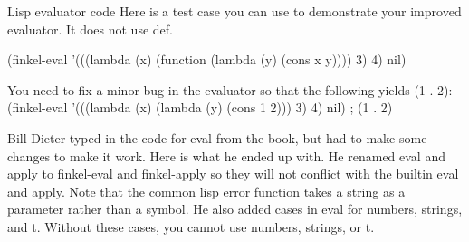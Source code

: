 Lisp evaluator code Here is a test case you can use to demonstrate your
improved evaluator. It does not use def.

\begin{english}
(finkel-eval '(((lambda (x) (function (lambda (y) (cons x y)))) 3) 4) nil)
\end{english}

You need to fix a minor bug in the evaluator so that the following yields (1 .
2): (finkel-eval '(((lambda (x) (lambda (y) (cons 1 2))) 3) 4) nil) ; (1 . 2)

Bill Dieter typed in the code for eval from the book, but had to make some changes to make it work. Here is what he ended up with. He renamed eval and apply to finkel-eval and finkel-apply so they will not conflict with the builtin eval and apply.
Note that the common lisp error function takes a string as a parameter rather than a symbol. He also added cases in eval for numbers, strings, and t. Without these cases, you cannot use numbers, strings, or t.

